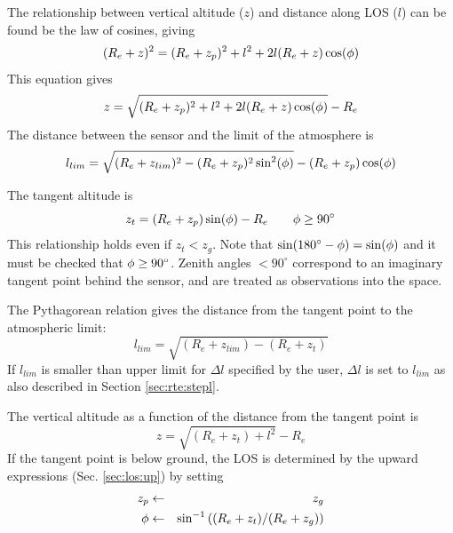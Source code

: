   The relationship between vertical altitude ($z$) and distance along
  LOS ($l$) can be found be the law of cosines, giving
  \begin{equation}
    (R_e+z)^2 = (R_e+z_p)^2 + l^2 + 2l(R_e+z)\cos(\phi)
  \end{equation}
  This equation gives
  \begin{equation}
    z = \sqrt{ (R_e+z_p)^2 + l^2 + 2l(R_e+z)\cos(\phi) } - R_e
  \end{equation}
  The distance between the sensor and the limit of the atmosphere is
  \begin{equation}
      l_{lim} = \sqrt{ (R_e+z_{lim})^2 - (R_e+z_p)^2\sin^2(\phi) } - 
                                       (R_e+z_p)\cos(\phi)
  \end{equation}


  \label{sec:los:limb}
  
  The tangent altitude is
  \begin{equation}
    z_t = (R_e+z_p)\sin(\phi) - R_e \qquad  \phi\geq90^\circ
   \label{eq:los:ztan}
  \end{equation}
  This relationship holds even if $z_t<z_g$. Note that
  $\sin(180^\circ-\phi)=\sin(\phi)$ and it must be checked that
  $\phi\geq90^\circ$. Zenith angles $<90^\circ$ correspond to an
  imaginary tangent point behind the sensor, and are treated as
  observations into the space.
  
  The Pythagorean relation gives the distance from the tangent point
  to the atmospheric limit:
  \begin{equation}
      l_{lim} = \sqrt{ (R_e+z_{lim}) - (R_e+z_t)}
  \end{equation}
  If $l_{lim}$ is smaller than upper limit for $\Delta l$ specified by
  the user, $\Delta l$ is set to $l_{lim}$ as also described in Section
  \ref{sec:rte:stepl}.

  The vertical altitude as a function of the distance from the
  tangent point is
  \begin{equation}
    z = \sqrt{ (R_e+z_t) + l^2} - R_e
  \end{equation}
  If the tangent point is below ground, the LOS is determined by the
  upward expressions (Sec. \ref{sec:los:up}) by setting
  \begin{eqnarray}
     z_p  & \gets & z_g          \nonumber  \\
     \phi & \gets & \sin^{-1}\left((R_e+z_t)/(R_e+z_g) \right) \nonumber 
  \end{eqnarray}


